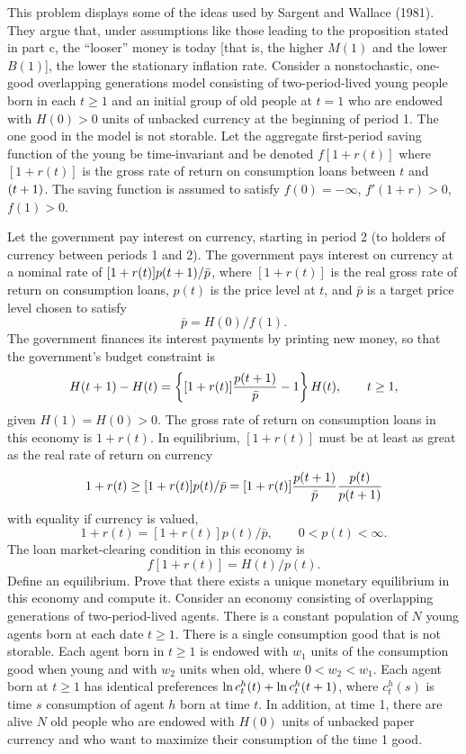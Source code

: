 This problem displays some of the ideas used by Sargent and Wallace (1981).
They argue that, under assumptions like those leading to the
proposition stated in part c, the ``looser'' money is today [that is, the
higher $M(1)$ and the lower $B(1)$], the lower the stationary inflation rate.
\medskip
{}
\medskip
\noindent Consider a nonstochastic, one-good overlapping generations model consisting of
two-period-lived young people born in each $t\ge 1$ and  an initial group of
old people at $t=1$ who are endowed with $H(0)>0$ units of unbacked currency at
the beginning of period 1.  The one good in the model is not storable.  Let the
aggregate first-period saving function of the young be time-invariant and be
denoted $f[1+r(t)]$ where $[1+r(t)]$ is the gross rate of return on consumption
loans between $t$ and $({t+1})$.  The saving function is assumed to satisfy
$f(0)=-\infty$, $f'(1+r)>0$, $f(1)>0$.

Let the government pay interest on currency, starting in period 2 (to holders
of currency between periods 1 and 2).  The government pays interest on currency
at a nominal rate of $[1+r(t)] p({t+1})/\bar p$, where $[1+r(t)]$ is the real
gross rate of return on consumption loans, $p(t)$ is the price level at $t$,
and $\bar p$ is a target price level chosen to satisfy
$$\bar p=H(0)/f(1).$$
The government finances its interest payments by printing new money, so that
the government's budget constraint is
$$H({t+1})-H(t) =\left\{ [1+r(t)] {p({t+1})\over \bar p} -1\right\} H(t),\qquad
t\ge 1,$$
given $H(1)=H(0)>0$.  The gross rate of return on consumption loans in this
economy is $1+r(t)$.  In equilibrium, $[1+r(t)]$ must be at least
as great as the real rate of return on currency
$$1+r(t) \geq [1+r(t)] p(t)/\bar p =[1+r(t)] {p({t+1})\over \bar p} {p(t)\over p({t+1})}$$
with equality if currency is valued,
$$1+r(t) = [1+r(t)]p(t)/\bar p,\qquad 0<p(t)<\infty.$$
The loan market-clearing condition in this economy is
$$f[1+r(t)]=H(t)/p(t).$$
\medskip{} Define an equilibrium.
\medskip{}
 Prove that there exists a unique monetary equilibrium in this economy
and compute it.
\medskip
{}
\medskip
\noindent Consider an economy consisting of overlapping generations of two-period-lived
agents.  There is a constant population of $N$ young agents born at each date
$t\ge 1$.  There is a single consumption good that is not storable.  Each agent
born in $t\ge 1$ is endowed with $w_1$ units of the consumption good when young
and with $w_2$ units when old, where $0<w_2<w_1$.  Each agent born at $t\ge 1$
has identical preferences $\mathop{\hbox{ln}} c_t^h(t) +\mathop{\hbox{ln}} c_t^h ({t+1})$, where $c_t^h(s)$
is time $s$ consumption of agent $h$ born at time $t$.  In addition, at time 1,
there are alive $N$ old people who are endowed with $H(0)$ units of unbacked
paper currency and who want to maximize their consumption of the time 1 good.

